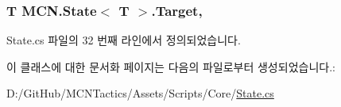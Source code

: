 \subsubsection[{\texorpdfstring{Target}{Target}}]{\setlength{\rightskip}{0pt plus 5cm}T {\bf M\+C\+N.\+State}$<$ T $>$.Target\hspace{0.3cm}{\ttfamily [get]}, {\ttfamily [protected]}}\hypertarget{class_m_c_n_1_1_state_a93ba2fd920292031bd6e65b1dc505cb3}{}\label{class_m_c_n_1_1_state_a93ba2fd920292031bd6e65b1dc505cb3}


State.\+cs 파일의 32 번째 라인에서 정의되었습니다.



이 클래스에 대한 문서화 페이지는 다음의 파일로부터 생성되었습니다.\+:\begin{DoxyCompactItemize}
\item 
D\+:/\+Git\+Hub/\+M\+C\+N\+Tactics/\+Assets/\+Scripts/\+Core/\hyperlink{_state_8cs}{State.\+cs}\end{DoxyCompactItemize}

